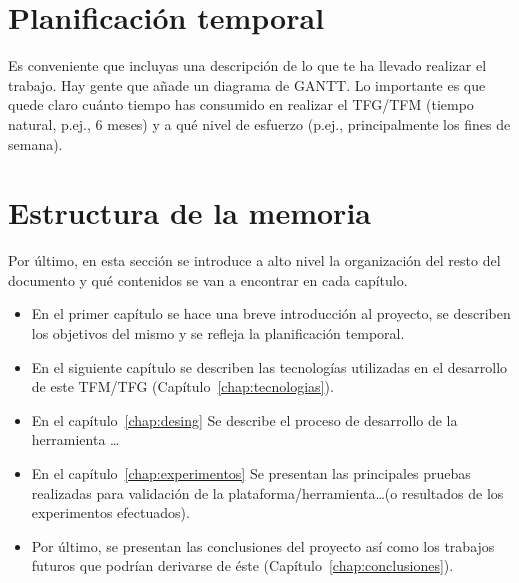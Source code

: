 \section{Planificación temporal}
\label{sec:planificacion-temporal}

Es conveniente que incluyas una descripción de lo que te ha llevado realizar el trabajo.
Hay gente que añade un diagrama de GANTT.
Lo importante es que quede claro cuánto tiempo has consumido en realizar el TFG/TFM 
(tiempo natural, p.ej., 6 meses) y a qué nivel de esfuerzo (p.ej., principalmente los 
fines de semana).

\section{Estructura de la memoria}
\label{sec:estructura}

Por último, en esta sección se introduce a alto nivel la organización del resto del documento
y qué contenidos se van a encontrar en cada capítulo.

    \begin{itemize}
      \item En el primer capítulo se hace una breve introducción al proyecto, se describen los objetivos del mismo y se refleja la planificación temporal.
      \item En el siguiente capítulo se describen las tecnologías utilizadas en el desarrollo de este TFM/TFG (Capítulo~\ref{chap:tecnologias}).
      \item En el capítulo~\ref{chap:desing} Se describe el proceso de desarrollo
      de la herramienta \ldots
      \item En el capítulo~\ref{chap:experimentos} Se presentan las principales pruebas realizadas
      para validación de la plataforma/herramienta\ldots (o resultados de los experimentos
      efectuados).
      \item Por último, se presentan las conclusiones del proyecto así como los trabajos futuros que podrían derivarse de éste (Capítulo~\ref{chap:conclusiones}).
    \end{itemize}

\cleardoublepage